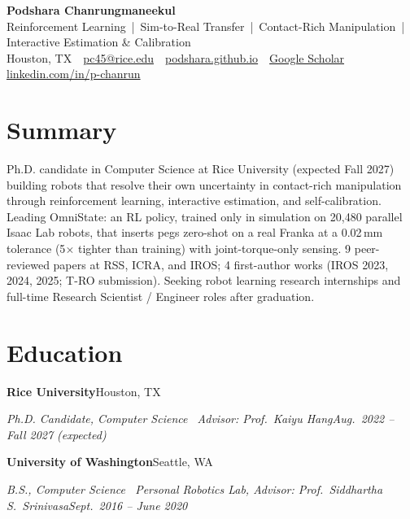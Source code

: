 \documentclass[10pt,letterpaper]{article}
\newcommand{\entry}[2]{\textbf{#1}\hfill #2\par}
\newcommand{\subentry}[2]{\textit{#1}\hfill\textit{#2}\par\vspace{1pt}}
\begin{document}
\raggedright

\begin{center}
  {\LARGE\bfseries\color{accent} Podshara Chanrungmaneekul}\\[3pt]
  {\small Reinforcement Learning \,|\, Sim-to-Real Transfer \,|\, Contact-Rich Manipulation \,|\, Interactive Estimation \& Calibration}\\[3pt]
  {\small
    Houston, TX \,\textbullet\,
    \href{mailto:pc45@rice.edu}{pc45@rice.edu} \,\textbullet\,
    \href{https://podshara.github.io}{podshara.github.io} \,\textbullet\,
    \href{https://scholar.google.com/citations?user=UA5y84MAAAAJ}{Google Scholar} \,\textbullet\,
    \href{https://www.linkedin.com/in/p-chanrun}{linkedin.com/in/p-chanrun}}
\end{center}
\vspace{-6pt}

\section{Summary}
Ph.D. candidate in Computer Science at Rice University (expected Fall 2027) building robots that resolve their own
uncertainty in contact-rich manipulation through reinforcement learning, interactive estimation, and self-calibration.
Leading OmniState: an RL policy, trained only in simulation on 20,480 parallel Isaac Lab robots, that inserts pegs
zero-shot on a real Franka at a 0.02\,mm tolerance (5$\times$ tighter than training) with joint-torque-only sensing. 9 peer-reviewed papers at RSS, ICRA, and IROS; 4 first-author works (IROS 2023, 2024, 2025; T-RO submission).
Seeking robot learning research internships and full-time Research Scientist / Engineer roles after graduation.

\section{Education}
\entry{Rice University}{Houston, TX}
\subentry{Ph.D. Candidate, Computer Science \textbullet\ Advisor: Prof.\ Kaiyu Hang}{Aug.\ 2022 -- Fall 2027 (expected)}
\entry{University of Washington}{Seattle, WA}
\subentry{B.S., Computer Science \textbullet\ Personal Robotics Lab, Advisor: Prof.\ Siddhartha S.\ Srinivasa}{Sept.\ 2016 -- June 2020}
\end{document}

